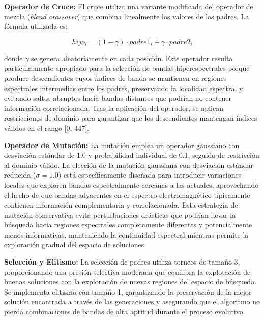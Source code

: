 \vspace{5mm}

\textbf{Operador de Cruce:} El cruce utiliza una variante modificada del operador de mezcla (\emph{blend crossover}) que combina linealmente los valores de los padres. La fórmula utilizada es:

\begin{equation}
hijo_i = (1-\gamma) \cdot padre1_i + \gamma \cdot padre2_i
\end{equation}

donde $\gamma$ se genera aleatoriamente en cada posición. Este operador resulta particularmente apropiado para la selección de bandas hiperespectrales porque produce descendientes cuyos índices de banda se mantienen en regiones espectrales intermedias entre los padres, preservando la localidad espectral y evitando saltos abruptos hacia bandas distantes que podrían no contener información correlacionada. Tras la aplicación del operador, se aplican restricciones de dominio para garantizar que los descendientes mantengan índices válidos en el rango [0, 447].

\vspace{5mm}

\textbf{Operador de Mutación:} La mutación emplea un operador gaussiano con desviación estándar de 1.0 y probabilidad individual de 0.1, seguido de restricción al dominio válido. La elección de la mutación gaussiana con desviación estándar reducida ($\sigma=1.0$) está específicamente diseñada para introducir variaciones locales que exploren bandas espectralmente cercanas a las actuales, aprovechando el hecho de que bandas adyacentes en el espectro electromagnético típicamente contienen información complementaria y correlacionada. Esta estrategia de mutación conservativa evita perturbaciones drásticas que podrían llevar la búsqueda hacia regiones espectrales completamente diferentes y potencialmente menos informativas, manteniendo la continuidad espectral mientras permite la exploración gradual del espacio de soluciones.

\vspace{5mm}

\textbf{Selección y Elitismo:} La selección de padres utiliza torneos de tamaño 3, proporcionando una presión selectiva moderada que equilibra la explotación de buenas soluciones con la exploración de nuevas regiones del espacio de búsqueda. Se implementa elitismo con tamaño 1, garantizando la preservación de la mejor solución encontrada a través de las generaciones y asegurando que el algoritmo no pierda combinaciones de bandas de alta aptitud durante el proceso evolutivo.

